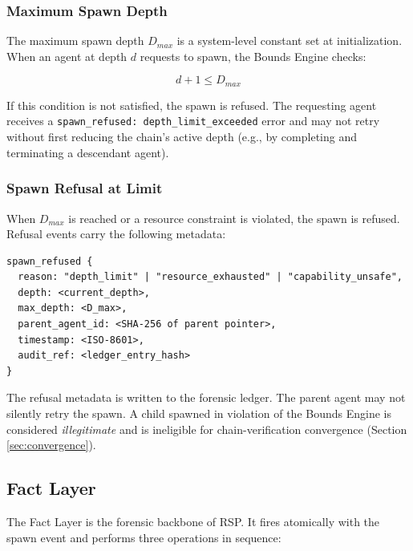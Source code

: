 \subsubsection{Maximum Spawn Depth}

The maximum spawn depth $D_{max}$ is a system-level constant set at initialization. When an agent at depth $d$ requests to spawn, the Bounds Engine checks:

\[
d + 1 \leq D_{max}
\]

If this condition is not satisfied, the spawn is refused. The requesting agent receives a \texttt{spawn\_refused: depth\_limit\_exceeded} error and may not retry without first reducing the chain's active depth (e.g., by completing and terminating a descendant agent).

\subsubsection{Spawn Refusal at Limit}

When $D_{max}$ is reached or a resource constraint is violated, the spawn is refused. Refusal events carry the following metadata:

\begin{verbatim}
spawn_refused {
  reason: "depth_limit" | "resource_exhausted" | "capability_unsafe",
  depth: <current_depth>,
  max_depth: <D_max>,
  parent_agent_id: <SHA-256 of parent pointer>,
  timestamp: <ISO-8601>,
  audit_ref: <ledger_entry_hash>
}
\end{verbatim}

The refusal metadata is written to the forensic ledger. The parent agent may not silently retry the spawn. A child spawned in violation of the Bounds Engine is considered \textit{illegitimate} and is ineligible for chain-verification convergence (Section \ref{sec:convergence}).

\subsection{Fact Layer}

The Fact Layer is the forensic backbone of RSP. It fires atomically with the spawn event and performs three operations in sequence:

